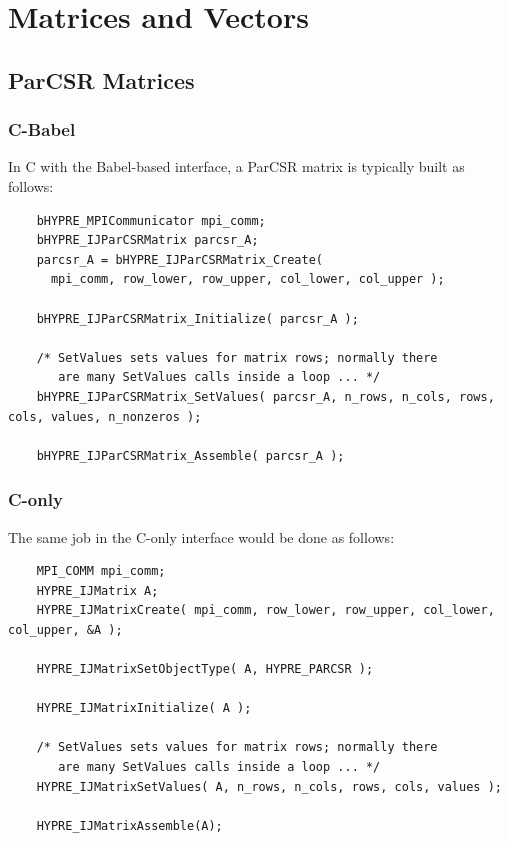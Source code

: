 




\section{Matrices and Vectors}

\subsection{ParCSR Matrices}

\subsubsection{C-Babel}
In C with the Babel-based interface, a ParCSR matrix is typically built as follows:

\begin{verbatim}
    bHYPRE_MPICommunicator mpi_comm;
    bHYPRE_IJParCSRMatrix parcsr_A;
    parcsr_A = bHYPRE_IJParCSRMatrix_Create(
      mpi_comm, row_lower, row_upper, col_lower, col_upper );

    bHYPRE_IJParCSRMatrix_Initialize( parcsr_A );

    /* SetValues sets values for matrix rows; normally there
       are many SetValues calls inside a loop ... */
    bHYPRE_IJParCSRMatrix_SetValues( parcsr_A, n_rows, n_cols, rows, cols, values, n_nonzeros );

    bHYPRE_IJParCSRMatrix_Assemble( parcsr_A );
\end{verbatim}

\subsubsection{C-only}
The same job in the C-only interface would be done as follows:

\begin{verbatim}
    MPI_COMM mpi_comm;
    HYPRE_IJMatrix A;
    HYPRE_IJMatrixCreate( mpi_comm, row_lower, row_upper, col_lower, col_upper, &A );

    HYPRE_IJMatrixSetObjectType( A, HYPRE_PARCSR );

    HYPRE_IJMatrixInitialize( A );

    /* SetValues sets values for matrix rows; normally there
       are many SetValues calls inside a loop ... */
    HYPRE_IJMatrixSetValues( A, n_rows, n_cols, rows, cols, values );

    HYPRE_IJMatrixAssemble(A);
\end{verbatim}


